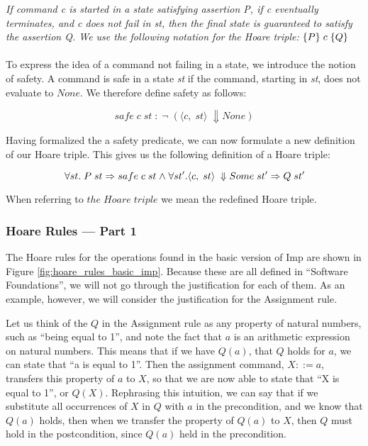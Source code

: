 \textit{If command c is started in a state satisfying assertion P, if c eventually terminates, and c does not fail in st, then the final state is guaranteed to satisfy the assertion Q. We use the following notation for the Hoare triple: } $\{{P}\}{\;c\;}\{{Q}\}$

\paragraph{}
To express the idea of a command not failing in a state, we introduce the notion of safety. A command is safe in a state {\it st} if the command, starting in {\it st}, does not evaluate to $None$. We therefore define safety as follows:

\[ \mathit{safe\;c\;st\;: \;\neg \;(\langle c,\;st\rangle\;\Downarrow None)}\]

Having formalized the a safety predicate, we can now formulate a new definition of our Hoare triple. This gives us the following definition of a Hoare triple:

\[
\forall st.\; P\;st \Rightarrow safe\;c\;st \mathrel{\wedge} \forall st'. \langle c,\;st\rangle\;\Downarrow Some\; st' \Rightarrow Q\;st'
\]

When referring to $the\;Hoare\;triple$ we mean the redefined Hoare triple.

\subsubsection{Hoare Rules --- Part 1}
The Hoare rules for the operations found in the basic version of Imp are shown in Figure \ref{fig:hoare_rules_basic_imp}. Because these are all defined in ``Software Foundations'', we will not go through the justification for each of them. As an example, however, we will consider the justification for the Assignment rule.

Let us think of the $Q$ in the Assignment rule as any property of natural numbers, such as ``being equal to 1'', and note the fact that $a$ is an arithmetic expression on natural numbers. This means that if we have $Q(a)$, that $Q$ holds for $a$, we can state that ``a is equal to 1''. Then the assignment command, $X ::= a$, transfers this property of $a$ to $X$, so that we are now able to state that ``X is equal to 1'', or $Q(X)$. Rephrasing this intuition, we can say that if we substitute all occurrences of $X$ in $Q$ with $a$ in the precondition, and we know that $Q(a)$ holds, then when we transfer the property of $Q(a)$ to $X$, then $Q$ must hold in the postcondition, since $Q(a)$ held in the precondition.

